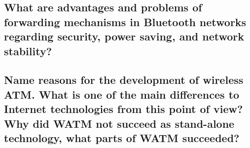 \subsection{What are advantages and problems of forwarding mechanisms in Bluetooth networks
regarding security, power saving, and network stability?}

\subsection{Name reasons for the development of wireless ATM. What is one of the main
differences to Internet technologies from this point of view? Why did WATM not
succeed as stand-alone technology, what parts of WATM succeeded?}


